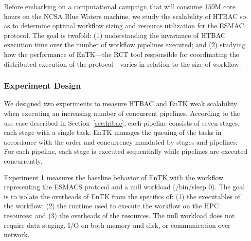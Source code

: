 
Before embarking on a computational campaign that will consume 150M core hours
on the NCSA Blue Waters machine, we study the scalability of HTBAC so as to
determine optimal workflow sizing and resource utilization for the ESMAC
protocol. The goal is twofold: (1) understanding the invariance of HTBAC
execution time over the number of workflow pipelines executed; and (2)
studying how the performance of EnTK---the RCT tool responsible for
coordinating the distributed execution of the protocol---varies in relation to
the size of workflow.

\subsubsection{Experiment Design}\label{ssec:exp_design}

We designed two experiments to measure HTBAC and EnTK weak scalability when
executing an increasing number of concurrent pipelines. According to the use
case described in Section~\ref{sec:htbac}, each pipeline consists of seven
stages, each stage with a single task. EnTK manages the queuing of the tasks
in accordance with the order and concurrency mandated by stages and
pipelines: For each pipeline, each stage is executed sequentially while
pipelines are executed concurrently.


Experiment 1 measures the baseline behavior of EnTK with the workflow
representing the ESMACS protocol and a null workload (\textmd{/bin/sleep 0}).
The goal is to isolate the overheads of EnTK from the specifics of: (1) the
executables of the workflow; (2) the runtime used to execute the
workflow on the HPC resources; and (3) the overheads of the resources. The
null workload does not require data staging, I/O on both memory and disk, or
communication over network.

